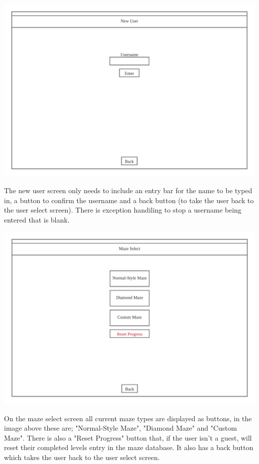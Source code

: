 \documentclass{article}
\begin{document}
\begin{center}
	\includegraphics[scale=0.7]{New User Screen}

	The new user screen only needs to include an entry bar for the name to be typed in, a button to confirm the username and a back button (to take the user back to the
	user select screen). There is exception handiling to stop a username being entered that is blank.
\end{center}

\begin{center}
	\includegraphics[scale=0.7]{Maze Select Screen}

	On the maze select screen all current maze types are displayed as buttons, in the image above these are; "Normal-Style Maze", "Diamond Maze" and "Custom Maze".
	There is also a "Reset Progress" button that, if the user isn't a guest, will reset their completed levels entry in the maze database. It also has a back button which takes
	the user back to the user select screen.
\end{center}
\end{document}
